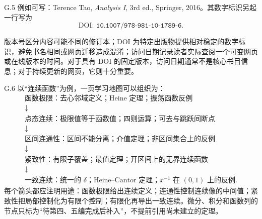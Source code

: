 \begin{solution}{G.5}
例如可写：Terence Tao, \emph{Analysis I}, 3rd ed., Springer, 2016。其数字标识另起一行写为
\[
 \text{DOI: }\texttt{10.1007/978-981-10-1789-6}.
\]

版本号区分内容可能不同的修订本；DOI 为特定出版物提供相对稳定的数字标识，避免书名相同或网页迁移造成混淆；访问日期记录读者实际查阅一个可变网页或在线版本的时间。对于具有 DOI 的固定版本，访问日期通常不是核心书目信息；对于持续更新的网页，它则十分重要。
\end{solution}

\begin{solution}{G.6}
以“连续函数”为例，一页学习地图可以组织为：
\[
 \begin{array}{c}
 \text{函数极限：去心邻域定义；Heine 定理；振荡函数反例}\\
 \downarrow\\
 \text{点态连续：极限值等于函数值；四则运算；可去与跳跃间断点}\\
 \downarrow\\
 \text{区间连通性：区间不能分离；介值定理；非区间集合上的反例}\\
 \downarrow\\
 \text{紧致性：有限子覆盖；最值定理；开区间上的无界连续函数}\\
 \downarrow\\
 \text{一致连续：统一的 }\delta\text{；Heine--Cantor 定理；}x^{-1}\text{ 在 }(0,1)\text{ 上的反例}.
 \end{array}
\]
每个箭头都应注明用途：函数极限给出连续定义；连通性控制连续像的中间值；紧致性把局部控制化为有限个控制；有限化再导出一致连续。微分、积分和函数列的节点只标为“待第四、五编完成后补入”，不提前引用尚未建立的定理。
\end{solution}
